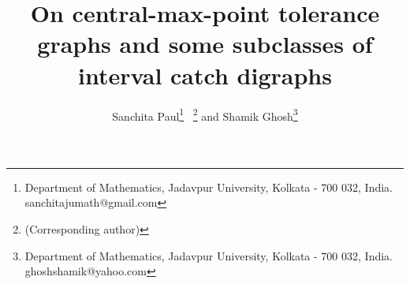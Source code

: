 \documentclass{article}
\theoremstyle{definition}
\numberwithin{equation}{section}
\begin{document}

\title{On central-max-point tolerance graphs and some subclasses of interval catch digraphs}
\author{Sanchita Paul\thanks{Department of Mathematics, Jadavpur University, Kolkata - 700 032, India. sanchitajumath@gmail.com} \ \thanks{(Corresponding author)} and
Shamik Ghosh\thanks{Department of Mathematics, Jadavpur University, Kolkata - 700 032, India. ghoshshamik@yahoo.com}}

\date{}


\maketitle

\null
\vspace{-4.5em}
\end{document}
